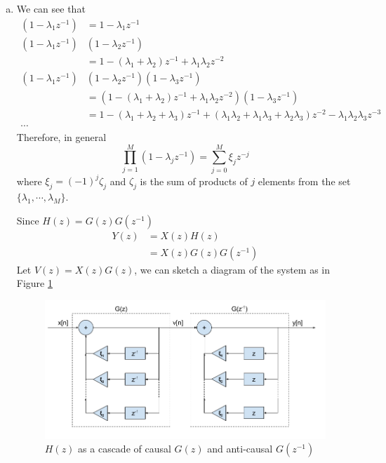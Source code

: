 \begin{enumerate}[(a)]
\item We can see that
\begin{align*}
	(1 - \lambda_1 z^{-1}) &= 1 - \lambda_1 z^{-1} \\
	(1 - \lambda_1 z^{-1})&(1 - \lambda_2z^{-1}) \\ &= 1 - (\lambda_1 + \lambda_2)z^{-1} + \lambda_1 \lambda_2 z^{-2} \\
	(1 - \lambda_1 z^{-1})&(1 - \lambda_2 z^{-1})(1 - \lambda_3 z^{-1}) \\ &= (1 - (\lambda_1 + \lambda_2)z^{-1} + \lambda_1 \lambda_2 z^{-2})(1 - \lambda_3 z^{-1}) \\
	&= 1 - (\lambda_1 + \lambda_2 + \lambda_3)z^{-1} + (\lambda_1\lambda_2 + \lambda_1\lambda_3 + \lambda_2\lambda_3)z^{-2} - \lambda_1\lambda_2\lambda_3 z^{-3} \\
	\cdots
\end{align*}
Therefore, in general
\[\prod_{j=1}^{M} (1-\lambda_j z^{-1}) = \sum_{j=0}^M \xi_j z^{-j}\]
where $\xi_j = (-1)^j \zeta_j$ and $\zeta_j$ is the sum of products of $j$ elements from the set $\{\lambda_1, \cdots, \lambda_M\}$.

Since $H(z) = G(z)G(z^{-1})$
\begin{align*}
	Y(z) 
	&= X(z)H(z) \\
	&= X(z)G(z)G(z^{-1})
\end{align*}
Let $V(z) = X(z)G(z)$, we can sketch a diagram of the system as in Figure \ref{fig:p5d}

\begin{figure}[htbp]
	\centering
	\includegraphics[width=\linewidth]{images/p5d}
	\caption{$H(z)$ as a cascade of causal $G(z)$ and anti-causal $G(z^{-1})$}
	\label{fig:p5d}
\end{figure}
\end{enumerate}